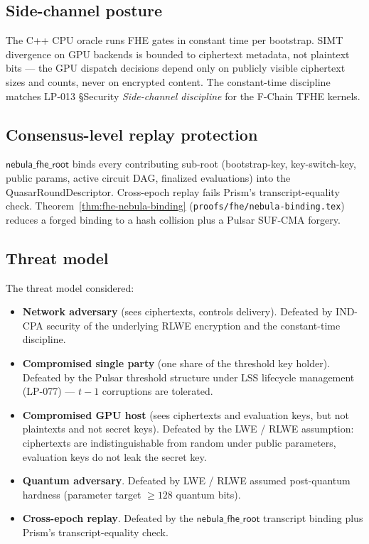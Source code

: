 \subsection{Side-channel posture}

The C++ CPU oracle runs FHE gates in constant time per bootstrap.
SIMT divergence on GPU backends is bounded to ciphertext metadata,
not plaintext bits --- the GPU dispatch decisions depend only on
publicly visible ciphertext sizes and counts, never on encrypted
content. The constant-time discipline matches LP-013 \S Security
\emph{Side-channel discipline} for the F-Chain TFHE kernels.

\subsection{Consensus-level replay protection}

$\mathsf{nebula\_fhe\_root}$ binds every contributing sub-root (bootstrap-key,
key-switch-key, public params, active circuit DAG, finalized
evaluations) into the QuasarRoundDescriptor. Cross-epoch replay
fails Prism's transcript-equality check. Theorem~\ref{thm:fhe-nebula-binding}
(\texttt{proofs/fhe/nebula-binding.tex}) reduces a forged binding
to a hash collision plus a Pulsar SUF-CMA forgery.

\subsection{Threat model}

The threat model considered:

\begin{itemize}
\item \textbf{Network adversary} (sees ciphertexts, controls
delivery). Defeated by IND-CPA security of the underlying RLWE
encryption and the constant-time discipline.
\item \textbf{Compromised single party} (one share of the threshold
key holder). Defeated by the Pulsar threshold structure under
LSS lifecycle management (LP-077) --- $t-1$ corruptions are
tolerated.
\item \textbf{Compromised GPU host} (sees ciphertexts and
evaluation keys, but not plaintexts and not secret keys). Defeated
by the LWE / RLWE assumption: ciphertexts are
indistinguishable from random under public parameters, evaluation
keys do not leak the secret key.
\item \textbf{Quantum adversary}. Defeated by LWE / RLWE assumed
post-quantum hardness (parameter target $\geq 128$ quantum bits).
\item \textbf{Cross-epoch replay}. Defeated by the
$\mathsf{nebula\_fhe\_root}$ transcript binding plus Prism's
transcript-equality check.
\end{itemize}

